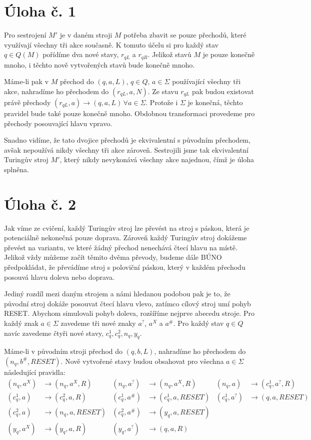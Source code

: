 \documentclass{scrartcl}
\begin{document}
    \section*{Úloha č. 1}
    Pro sestrojení $M'$ je v daném stroji $M$ potřeba zbavit se pouze přechodů, které využívají všechny tři akce současně. K tomuto účelu si pro každý stav $q\in Q(M)$ pořídíme dva nové stavy, $r_{qL}$ a $r_{qR}$. Jelikož stavů $M$ je pouze konečně mnoho, i těchto nově vytvořených stavů bude konečně mnoho. 

    Máme-li pak v $M$ přechod do $(q,a,L),\,q\in Q,\,a\in\Sigma$ používající všechny tři akce, nahradíme ho přechodem do $(r_{qL},a,N)$. Ze stavu $r_{qL}$ pak budou existovat právě přechody $(r_{qL},a) \rightarrow (q,a,L)\,\forall a\in\Sigma$. Protože i $\Sigma$ je konečná, těchto pravidel bude také pouze konečně mnoho. Obdobnou transformaci provedeme pro přechody posouvající hlavu vpravo.

    Snadno vidíme, že tato dvojice přechodů je ekvivalentní s původním přechodem, avšak nepoužívá nikdy všechny tři akce zároveň. Sestrojili jsme tak ekvivalentní Turingův stroj $M'$, který nikdy nevykonává všechny akce najednou, čímž je úloha splněna.

    \section*{Úloha č. 2}
    Jak víme ze cvičení, každý Turingův stroj lze převést na stroj s páskou, která je potenciálně nekonečná pouze doprava. Zároveň každý Turingův stroj dokážeme převést na variantu, ve které žádný přechod nenechává čtecí hlavu na místě. Jelikož vždy můžeme začít těmito dvěma převody, budeme dále BÚNO předpokládat, že převádíme stroj s poloviční páskou, který v každém přechodu posouvá hlavu doleva nebo doprava.
    
    Jediný rozdíl mezi daným strojem a námi hledanou podobou pak je to, že původní stroj dokáže posouvat čtecí hlavu vlevo, zatímco cílový stroj umí pohyb RESET. Abychom simulovali pohyb doleva, rozšíříme nejprve abecedu stroje. Pro každý znak $a\in\Sigma$ zavedeme tři nové znaky $a^?$, $a^X$ a $a^{\#}$. Pro každý stav $q\in Q$ navíc zavedeme čtyři nové stavy, $c^1_q, c^2_q, n_q, y_q$. 

    Máme-li v původním stroji přechod do $(q,b,L)$, nahradíme ho přechodem do $(n_q, b^{\#}, RESET)$. Nově vytvořené stavy budou obsahovat pro všechna $a\in\Sigma$ následující pravidla:
    \begin{align*}
        (n_q, a^X) &\rightarrow (n_q, a^X, R) & 
        (n_q, a^?) &\rightarrow (n_q, a^X, R) &
        (n_q, a) &\rightarrow (c^1_q, a^?, R) \\
        (c^1_q, a) &\rightarrow (c^2_q, a, R) &
        (c^1_q, a^{\#}) &\rightarrow (c^1_q, a, RESET) &
        (c^1_q, a^?) &\rightarrow (q, a, RESET)\\
        (c^2_q, a) &\rightarrow (n_q, a, RESET) & 
        (c^2_q, a^{\#}) &\rightarrow (y_q, a, RESET) \\
        (y_q, a^X) &\rightarrow (y_q, a, R) &
        (y_q, a^?) &\rightarrow (q, a, R)
    \end{align*}
\end{document}
